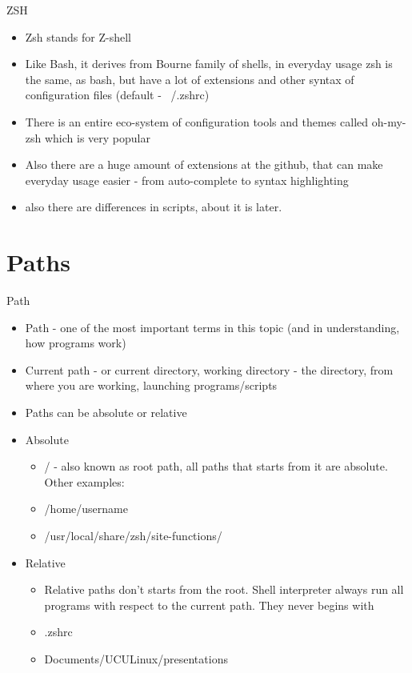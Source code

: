\documentclass[usenames,dvipsnames,10pt,aspectratio=169]{beamer}
\begin{document}
\begin{frame}{ZSH}
    \begin{itemize}
        \item Zsh stands for {\color{ucugreen}Z-shell}
        \item Like Bash, it derives from Bourne family of shells, in everyday usage zsh is the same, as {\color{ucugreen} bash}, but have a lot of extensions and other syntax of configuration files (default - {\color{ucugreen}~/.zshrc})
        \item There is an entire eco-system of configuration tools and themes called oh-my-zsh which is very popular
        \item Also there are a huge amount of extensions at the github, that can make everyday usage easier - from auto-complete to syntax highlighting
        \item also there are differences in scripts, about it is later.
        
    \end{itemize}
\end{frame}

\section{Paths}
\begin{frame}{Path}
    \begin{itemize}
        \item  {\color{ucugreen} Path} - one of the most important terms in this topic (and in understanding, how programs work)
        \item Current path - or current directory, working directory - the directory, from where you are working, launching programs/scripts
        \item Paths can be absolute or relative
        \item Absolute
            \begin{itemize}
                \item {\color{ucugreen} /} - also known as  {\color{ucugreen} root path}, all paths that starts from it are {\color{ucugreen} absolute}. Other examples:
                \item {\color{ucugreen} /home/username}
                \item {\color{ucugreen} /usr/local/share/zsh/site-functions/}
            \end{itemize}
        \item Relative
            \begin{itemize}
                \item Relative paths don't starts from the root. Shell interpreter always run all programs with respect to the current path. They never begins with \ex{/}
                \item {\color{ucugreen} .zshrc}
                \item {\color{ucugreen} Documents/UCULinux/presentations}
            \end{itemize}
    \end{itemize}
\end{frame}
\end{document}
